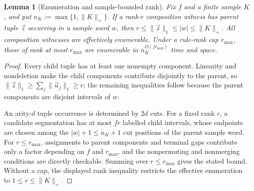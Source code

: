 \documentclass[11pt]{article}
\numberwithin{equation}{section}
\theoremstyle{plain}
\newtheorem{lemma}[theorem]{Lemma}
\theoremstyle{definition}
\theoremstyle{remark}
\newcommand{\tuple}[1]{\vec{#1}}
\theoremstyle{plain}
\begin{document}
\begin{lemma}[Enumeration and sample-bounded rank]
\label{lem:general-witness-enumeration}
Fix $f$ and a finite sample $K$, and put $n_K:=\max\{1,\|K\|_+\}$.  If a
rank-$r$ composition witness has parent tuple $\tuple z$ occurring in a sample
word $w$, then
\(r\le\|\tuple z\|_1\le |w|\le\|K\|_+.\)
All composition witnesses are effectively enumerable.  Under a rule-rank cap
$r_{\max}$, those of rank at most $r_{\max}$ are enumerable in
$n_K^{O(f r_{\max})}$ time and space.
\end{lemma}
\begin{proof}
Every child tuple has at least one nonempty component.  Linearity and
nondeletion make the child components contribute disjointly to the parent, so
$\|\tuple z\|_1\ge\sum_j\|\tuple u_j\|_1\ge r$; the remaining inequalities
follow because the parent components are disjoint intervals of $w$.

An arity-$d$ tuple occurrence is determined by $2d$ cuts.  For a fixed rank
$r$, a candidate segmentation has at most $fr$ labelled child intervals, whose endpoints are chosen among the $|w|+1\le n_K+1$ cut positions of
the parent sample word.  For $r\le r_{\max}$, assignments to parent components and
terminal gaps contribute only a factor depending on $f$ and $r_{\max}$, and
the nonpermuting and nonmerging conditions are directly checkable.  Summing
over $r\le r_{\max}$ gives the stated bound.  Without a cap, the displayed
rank inequality restricts the effective enumeration to
$1\le r\le\|K\|_+$.
\end{proof}
\end{document}
